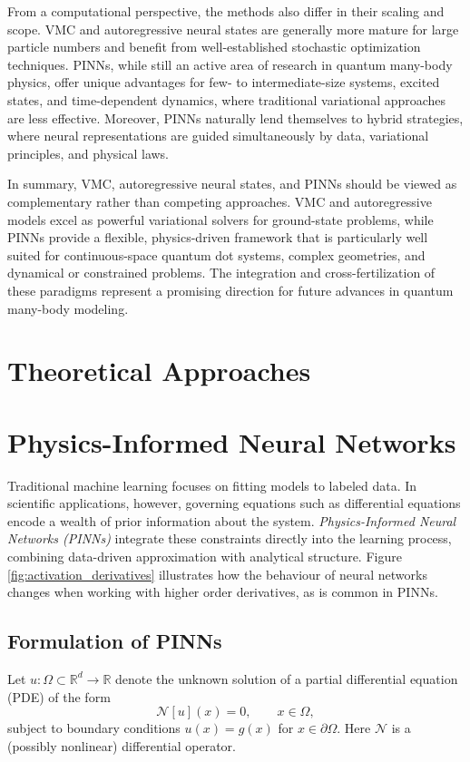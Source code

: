 \documentclass[superscriptaddress,unsortedaddress,amsmath,amssymb,aps]{revtex4-2}
\begin{document}
From a computational perspective, the methods also differ in their
scaling and scope. VMC and autoregressive neural states are generally
more mature for large particle numbers and benefit from
well-established stochastic optimization techniques. PINNs, while
still an active area of research in quantum many-body physics, offer
unique advantages for few- to intermediate-size systems, excited
states, and time-dependent dynamics, where traditional variational
approaches are less effective. Moreover, PINNs naturally lend
themselves to hybrid strategies, where neural representations are
guided simultaneously by data, variational principles, and physical
laws.

In summary, VMC, autoregressive neural states, and PINNs should be
viewed as complementary rather than competing approaches. VMC and
autoregressive models excel as powerful variational solvers for
ground-state problems, while PINNs provide a flexible, physics-driven
framework that is particularly well suited for continuous-space
quantum dot systems, complex geometries, and dynamical or constrained
problems. The integration and cross-fertilization of these paradigms
represent a promising direction for future advances in quantum
many-body modeling.



\section{Theoretical Approaches}


\section{Physics-Informed Neural Networks}
\label{sec:pinns}

Traditional machine learning focuses on fitting models to labeled data. 
In scientific applications, however, governing equations such as differential 
equations encode a wealth of prior information about the system. 
\emph{Physics-Informed Neural Networks (PINNs)} integrate these constraints 
directly into the learning process, combining data-driven approximation 
with analytical structure.  Figure \ref{fig:activation_derivatives} illustrates how the behaviour of neural networks changes when working with higher order derivatives, as is common in PINNs. 


\subsection{Formulation of PINNs}
Let $u:\Omega \subset \mathbb{R}^d \to \mathbb{R}$ denote the unknown solution 
of a partial differential equation (PDE) of the form
\begin{equation}
  \mathcal{N}[u](x) = 0, \qquad x \in \Omega,
\end{equation}
subject to boundary conditions $u(x)=g(x)$ for $x\in\partial\Omega$.  
Here $\mathcal{N}$ is a (possibly nonlinear) differential operator.  
\end{document}
